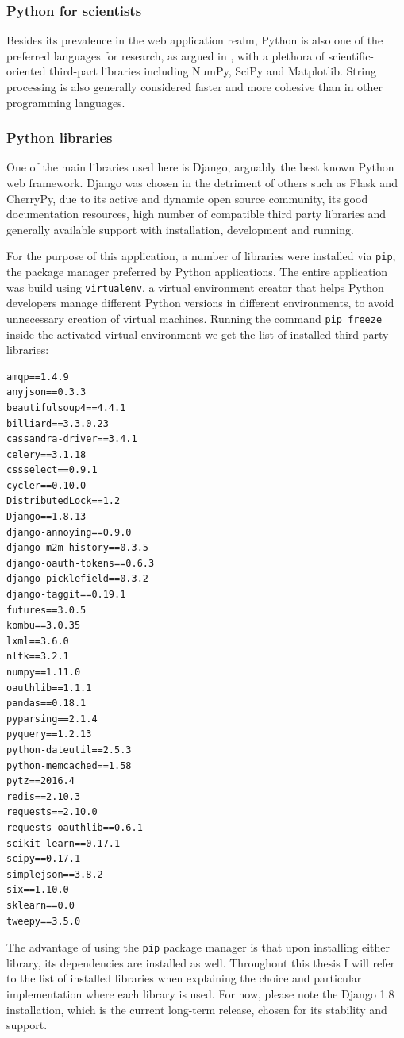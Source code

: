 \documentclass[12pt,a4paper,twoside]{report}
\begin{document}
\subsubsection{Python for scientists}
Besides its prevalence in the web application realm, Python is also one of the preferred languages for research, as argued in \cite{millman2011python}, with a plethora of scientific-oriented third-part libraries including NumPy, SciPy and Matplotlib. String processing is also generally considered faster and more cohesive than in other programming languages.

\subsubsection{Python libraries}
One of the main libraries used here is Django, arguably the best known Python web framework. Django was chosen in the detriment of others such as Flask and CherryPy, due to its active and dynamic open source community, its good documentation resources, high number of compatible third party libraries and generally available support with installation, development and running.

For the purpose of this application, a number of libraries were installed via \texttt{pip}, the package manager preferred by Python applications. The entire application was build using \texttt{virtualenv}, a virtual environment creator that helps Python developers manage different Python versions in different environments, to avoid unnecessary creation of virtual machines. Running the command \texttt{pip freeze} inside the activated virtual environment we get the list of installed third party libraries:

\lstset{basicstyle=\scriptsize}
\begin{lstlisting}
amqp==1.4.9
anyjson==0.3.3
beautifulsoup4==4.4.1
billiard==3.3.0.23
cassandra-driver==3.4.1
celery==3.1.18
cssselect==0.9.1
cycler==0.10.0
DistributedLock==1.2
Django==1.8.13
django-annoying==0.9.0
django-m2m-history==0.3.5
django-oauth-tokens==0.6.3
django-picklefield==0.3.2
django-taggit==0.19.1
futures==3.0.5
kombu==3.0.35
lxml==3.6.0
nltk==3.2.1
numpy==1.11.0
oauthlib==1.1.1
pandas==0.18.1
pyparsing==2.1.4
pyquery==1.2.13
python-dateutil==2.5.3
python-memcached==1.58
pytz==2016.4
redis==2.10.3
requests==2.10.0
requests-oauthlib==0.6.1
scikit-learn==0.17.1
scipy==0.17.1
simplejson==3.8.2
six==1.10.0
sklearn==0.0
tweepy==3.5.0
\end{lstlisting}

The advantage of using the \texttt{pip} package manager is that upon installing either library, its dependencies are installed as well. Throughout this thesis I will refer to the list of installed libraries when explaining the choice and particular implementation where each library is used. For now, please note the Django 1.8 installation, which is the current long-term release, chosen for its stability and support.
\end{document}
